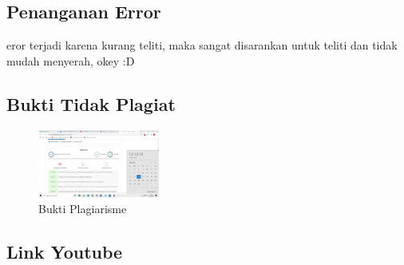 \subsection{Penanganan Error}
eror terjadi karena kurang teliti, maka sangat disarankan untuk teliti dan tidak mudah menyerah, okey :D

\subsection{Bukti Tidak Plagiat}
\begin{figure}[H]
\includegraphics[width=4cm]{figures/1174002/9/plagiarisme.png}
\centering
\caption{Bukti Plagiarisme}
\end{figure}

\subsection{Link Youtube}

